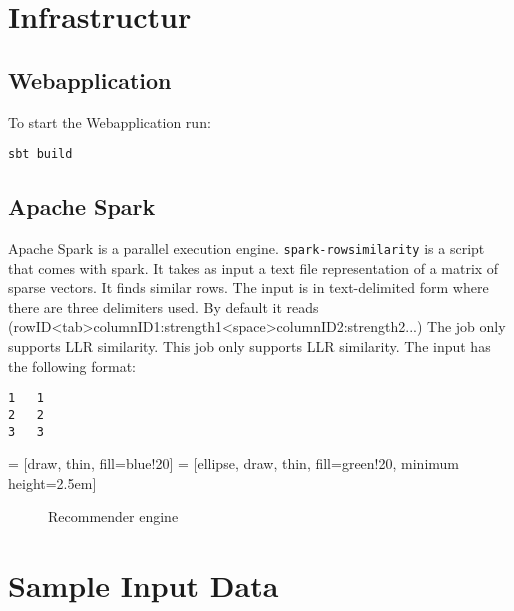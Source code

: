 \documentclass[twoside,a4paper]{article}
\begin{document}
\section{Infrastructur}
\label{sec:infrastructur}

\subsection{Webapplication}
\label{sec:web}

To start the Webapplication run:
\begin{verbatim}
sbt build 
\end{verbatim}

\subsection{Apache Spark}
\label{sec:spark}
Apache Spark is a parallel execution engine.
\verb|spark-rowsimilarity| is a script that comes with spark. It takes as input a text file representation of a matrix of sparse vectors. It finds similar rows. The input is in text-delimited form where there are three delimiters used. By default it reads (rowID<tab>columnID1:strength1<space>columnID2:strength2...) The job only supports LLR similarity. This job only supports LLR similarity.
The input has the following format:
\begin{verbatim}
1	1
2	2
3	3 
\end{verbatim}


 = [draw, thin, fill=blue!20]
 = [ellipse, draw, thin, fill=green!20, minimum height=2.5em]
\begin{figure}
\centering
{}
\caption{Recommender engine}
\end{figure}

\section{Sample Input Data}
\label{sec:sampleinput}
\end{document}
